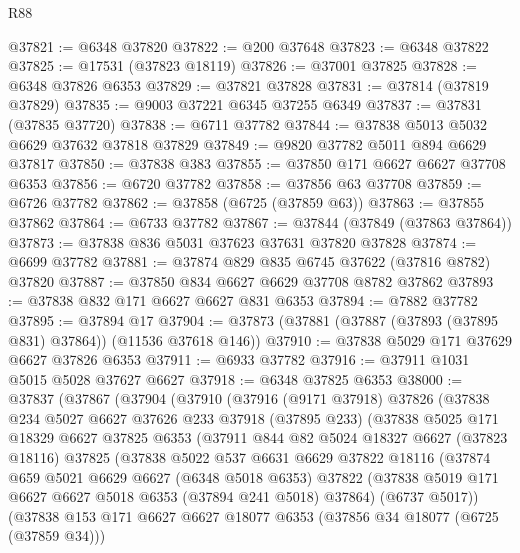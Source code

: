 \begin{lexlean}{R88}
\begin{coremodule}
@37821 := @6348 @37820
@37822 := @200 @37648
@37823 := @6348 @37822
@37825 := @17531 (@37823 @18119)
@37826 := @37001 @37825
@37828 := @6348 @37826 @6353
@37829 := @37821 @37828
@37831 := @37814 (@37819 @37829)
@37835 := @9003 @37221 @6345 @37255 @6349
@37837 := @37831 (@37835 @37720)
@37838 := @6711 @37782
@37844 := @37838 @5013 @5032 @6629 @37632 @37818 @37829
@37849 := @9820 @37782 @5011 @894 @6629 @37817
@37850 := @37838 @383
@37855 := @37850 @171 @6627 @6627 @37708 @6353
@37856 := @6720 @37782
@37858 := @37856 @63 @37708
@37859 := @6726 @37782
@37862 := @37858 (@6725 (@37859 @63))
@37863 := @37855 @37862
@37864 := @6733 @37782
@37867 := @37844 (@37849 (@37863 @37864))
@37873 := @37838 @836 @5031 @37623 @37631 @37820 @37828
@37874 := @6699 @37782
@37881 := @37874 @829 @835 @6745 @37622 (@37816 @8782) @37820
@37887 := @37850 @834 @6627 @6629 @37708 @8782 @37862
@37893 := @37838 @832 @171 @6627 @6627 @831 @6353
@37894 := @7882 @37782
@37895 := @37894 @17
@37904 := @37873 (@37881 (@37887 (@37893 (@37895 @831) @37864)) (@11536 @37618 @146))
@37910 := @37838 @5029 @171 @37629 @6627 @37826 @6353
@37911 := @6933 @37782
@37916 := @37911 @1031 @5015 @5028 @37627 @6627
@37918 := @6348 @37825 @6353
@38000 := @37837
    (@37867
      (@37904
        (@37910
          (@37916
            (@9171 @37918)
            @37826
            (@37838
              @234
              @5027
              @6627
              @37626
              @233
              @37918
              (@37895 @233)
              (@37838
                @5025
                @171
                @18329
                @6627
                @37825
                @6353
                (@37911
                  @844
                  @82
                  @5024
                  @18327
                  @6627
                  (@37823 @18116)
                  @37825
                  (@37838
                    @5022
                    @537
                    @6631
                    @6629
                    @37822
                    @18116
                    (@37874
                      @659
                      @5021
                      @6629
                      @6627
                      (@6348 @5018 @6353)
                      @37822
                      (@37838 @5019 @171 @6627 @6627 @5018 @6353 (@37894 @241 @5018) @37864)
                      (@6737 @5017))
                    (@37838
                      @153
                      @171
                      @6627
                      @6627
                      @18077
                      @6353
                      (@37856 @34 @18077 (@6725 (@37859 @34)))

\end{coremodule}
\end{lexlean}
